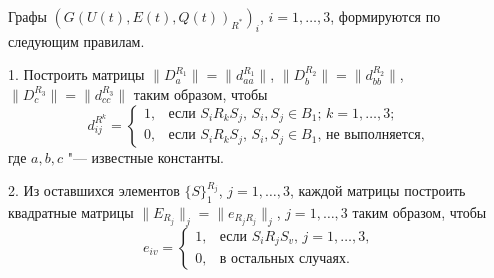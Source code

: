 \documentclass[12pt]{article}
\begin{document}
\noindent\hspace*{-0.5cm}{\Large\bfseries Вариант 3}

\bigskip

Графы \((G(U(t), E(t), Q(t))_{R^*})_i\), \(i = 1, \dots, 3\), формируются по следующим правилам.

\bigskip

1. Построить матрицы \(\|D_a^{R_1}\| = \|d_{aa}^{R_1}\|\), \(\|D_b^{R_2}\| = \|d_{bb}^{R_2}\|\), \(\|D_c^{R_3}\| = \|d_{cc}^{R_3}\|\) таким образом, чтобы
\begin{equation}
d_{ij}^{R^k} =
\begin{cases}
1, & \text{если } S_i R_k S_j, \, S_i, S_j \in B_1; \, k = 1, \dots, 3; \\
0, & \text{если } S_i R_k S_j, \, S_i, S_j \in B_1, \, \text{не выполняется},
\end{cases}
\end{equation}
где \(a, b, c\) "--- известные константы.

\bigskip

2. Из оставшихся элементов \(\{S\}_{1}^{R_j}\), \(j = 1, \dots, 3\), каждой матрицы построить квадратные матрицы \(\|E_{R_j}\|_j = \|e_{R_j R_j}\|_j\), \(j = 1, \dots, 3\) таким образом, чтобы
\begin{equation}
e_{iv} =
\begin{cases}
1, & \text{если } S_i R_j S_v, \, j = 1, \dots, 3, \\
0, & \text{в остальных случаях}.
\end{cases}
\end{equation}
\end{document}
